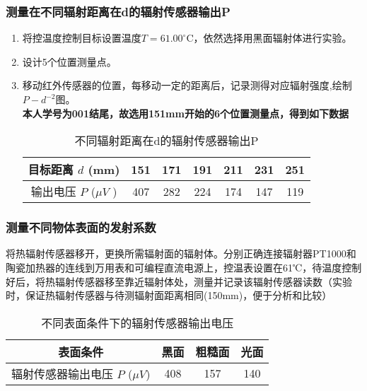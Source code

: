 \documentclass[dvipsnames, svgnames,a4paper,11pt]{article}
\begin{document}
	\subsubsection{测量在不同辐射距离在d的辐射传感器输出P }
\begin{enumerate}
	\item 将控温度控制目标设置温度$T=61.00^\circ$C，依然选择用黑面辐射体进行实验。

\item 设计5个位置测量点。

\item 移动红外传感器的位置，每移动一定的距离后，记录测得对应辐射强度,绘制$P-d^{-2}$图。\\
\textbf{ 本人学号为001结尾，故选用151mm开始的6个位置测量点，得到如下数据}
\begin{table}[htbp]
	\centering
	\caption{不同辐射距离在d的辐射传感器输出P}
	  \begin{tabular}{|c|cccccc|}
		\hline
	  目标距离 $d$ (mm) & 151 & 171 & 191 & 211 & 231&251 \\
	  \hline
	  输出电压 $P$ ($\mu V$ ) & 407 & 282 & 224& 174 & 147&119 \\
	  \hline
	  \end{tabular}%
	\label{tab:data_horizontal}%
  \end{table}%
\end{enumerate}
\subsubsection{测量不同物体表面的发射系数}
将热辐射传感器移开，更换所需辐射面的辐射体。分别正确连接辐射器PT1000和陶瓷加热器的连线到万用表和可编程直流电源上，控温表设置在61℃，待温度控制好后，将热辐射传感器移至靠近辐射体处，测量并记录该辐射传感器读数（实验时，保证热辐射传感器与待测辐射面距离相同(150mm)，便于分析和比较）
\begin{table}[H]
	\centering
	\caption{不同表面条件下的辐射传感器输出电压}
	  \begin{tabular}{|c|c|c|c|}
		\hline
	  表面条件 & 黑面 & 粗糙面 & 光面 \\
	  \hline
	  辐射传感器输出电压 $P$ ($\mu V$) & 408 & 157 & 140 \\
	  \hline
	  \end{tabular}%
	\label{tab:data_horizontal}%
  \end{table}%
\end{document}
